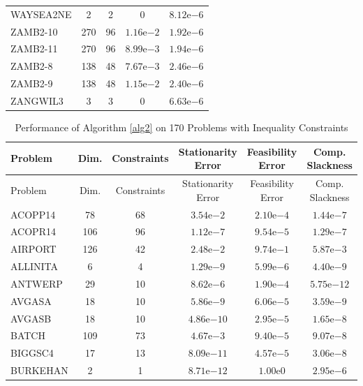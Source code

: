 \documentclass[11pt]{article}
\begin{document}
\begin{center}
\begin{longtable}{lcccc}
WAYSEA2NE & 2 & 2 & $0$ & $8.12\mathrm{e}{-6}$\\
ZAMB2-10 & 270 & 96 & $1.16\mathrm{e}{-2}$ & $1.92\mathrm{e}{-6}$\\
ZAMB2-11 & 270 & 96 & $8.99\mathrm{e}{-3}$ & $1.94\mathrm{e}{-6}$\\
ZAMB2-8 & 138 & 48 & $7.67\mathrm{e}{-3}$ & $2.46\mathrm{e}{-6}$\\
ZAMB2-9 & 138 & 48 & $1.15\mathrm{e}{-2}$ & $2.40\mathrm{e}{-6}$\\
ZANGWIL3 & 3 & 3 & $0$ & $6.63\mathrm{e}{-6}$\\
\bottomrule
\end{longtable}
\end{center}


\begin{center}
\scriptsize
\begin{longtable}{lccccc}
\caption{Performance of Algorithm \ref{alg2} on 170 Problems with Inequality Constraints} \\
\toprule
Problem & Dim. & Constraints & Stationarity Error & Feasibility Error & Comp. Slackness \\
\midrule
\endfirsthead
\toprule
Problem & Dim. & Constraints & Stationarity Error & Feasibility Error & Comp. Slackness \\
\midrule
\endhead
\bottomrule
\endfoot
ACOPP14 & 78 & 68 & $3.54\mathrm{e}{-2}$ & $2.10\mathrm{e}{-4}$ & $1.44\mathrm{e}{-7}$ \\
ACOPR14 & 106 & 96 & $1.12\mathrm{e}{-7}$ & $9.54\mathrm{e}{-5}$ & $1.29\mathrm{e}{-7}$ \\
AIRPORT & 126 & 42 & $2.48\mathrm{e}{-2}$ & $9.74\mathrm{e}{-1}$ & $5.87\mathrm{e}{-3}$ \\
ALLINITA & 6 & 4 & $1.29\mathrm{e}{-9}$ & $5.99\mathrm{e}{-6}$ & $4.40\mathrm{e}{-9}$ \\
ANTWERP & 29 & 10 & $8.62\mathrm{e}{-6}$ & $1.90\mathrm{e}{-4}$ & $5.75\mathrm{e}{-12}$ \\
AVGASA & 18 & 10 & $5.86\mathrm{e}{-9}$ & $6.06\mathrm{e}{-5}$ & $3.59\mathrm{e}{-9}$ \\
AVGASB & 18 & 10 & $4.86\mathrm{e}{-10}$ & $2.95\mathrm{e}{-5}$ & $1.65\mathrm{e}{-8}$ \\
BATCH & 109 & 73 & $4.67\mathrm{e}{-3}$ & $9.40\mathrm{e}{-5}$ & $9.07\mathrm{e}{-8}$ \\
BIGGSC4 & 17 & 13 & $8.09\mathrm{e}{-11}$ & $4.57\mathrm{e}{-5}$ & $3.06\mathrm{e}{-8}$ \\
BURKEHAN & 2 & 1 & $8.71\mathrm{e}{-12}$ & $1.00\mathrm{e}{0}$ & $2.95\mathrm{e}{-6}$ \\

\end{longtable}
\end{center}
\end{document}
